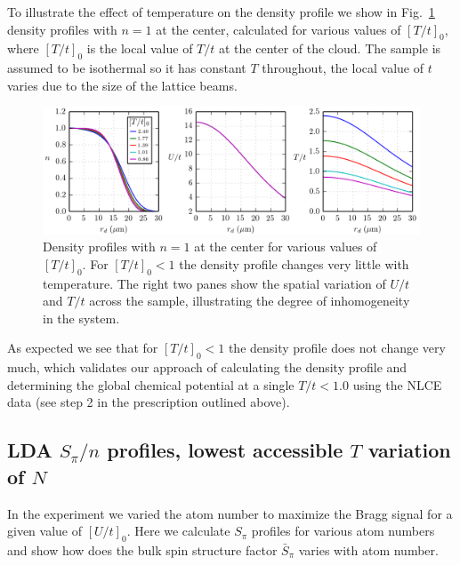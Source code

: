 \documentclass[11pt,letter]{article}
\begin{document}
To illustrate the effect of temperature on the density profile we show in
Fig.~\ref{fig:dens_varyT}  density profiles with $n=1$ at the center,
calculated for various values of $[T/t]_{0}$,  where $[T/t]_{0}$ is the local
value of $T/t$ at the center of the cloud.  The sample is assumed to be
isothermal so it has constant $T$ throughout, the local value of $t$ varies due
to the size of the lattice beams.
\begin{figure}
    \centering
\includegraphics[width=\textwidth]{../dataplots/Basic00/density_varyT.png}
\caption{Density profiles with $n=1$ at the center for various values of
$[T/t]_{0}$. For $[T/t]_{0}<1$ the density profile changes very little with
temperature.  The right two panes show the spatial variation of $U/t$ and $T/t$
across the sample, illustrating the degree of inhomogeneity in the system. }
\label{fig:dens_varyT}
\end{figure}
As expected we see that for $[T/t]_{0} < 1 $ the density profile does not change
very much, which validates our approach of calculating the density profile and
determining the global chemical potential at a single $T/t<1.0$  using
the NLCE data (see step 2 in the prescription outlined above).  


\subsection{ LDA $S_{\pi}/n$ profiles, lowest accessible $T$ variation of $N$} 
 
In the experiment we varied the atom number to maximize the Bragg signal for a
given value of $[U/t]_{0}$.   Here we calculate $S_{\pi}$ profiles for various
atom numbers and show how does the bulk spin structure factor $\bar{S}_{\pi}$
varies with atom number. 
\end{document}
